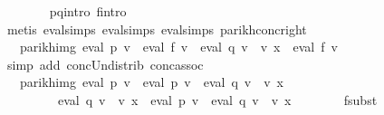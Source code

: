 \begin{isabellebody}
\ \ \ \ \ \ \isamarkupfalse%
\ p{}{\isacharunderscore}{\kern0pt}q{}{\isacharunderscore}{\kern0pt}intro\ f{}{\isacharprime}{\kern0pt}{\isacharunderscore}{\kern0pt}intro\isanewline
\ \ \ \ \ \ \isamarkupfalse%
\ {\isacharparenleft}{\kern0pt}metis\ eval{\isachardot}{\kern0pt}simps{\isacharparenleft}{\kern0pt}{}{\isacharparenright}{\kern0pt}\ eval{\isachardot}{\kern0pt}simps{\isacharparenleft}{\kern0pt}{}{\isacharparenright}{\kern0pt}\ eval{\isachardot}{\kern0pt}simps{\isacharparenleft}{\kern0pt}{}{\isacharparenright}{\kern0pt}\ parikh{\isacharunderscore}{\kern0pt}conc{\isacharunderscore}{\kern0pt}right{\isacharparenright}{\kern0pt}\isanewline
\ \ \ \ \isamarkupfalse%
\ \isamarkupfalse%
\ {\isachardoublequoteopen}{\isasymdots}\ {\isacharequal}{\kern0pt}\ parikh{\isacharunderscore}{\kern0pt}img\ {\isacharparenleft}{\kern0pt}eval\ p{}\ v\ {\isacharat}{\kern0pt}{\isacharat}{\kern0pt}\ eval\ f{}\ v\ {\isasymunion}\ eval\ q{}\ v\ {\isacharat}{\kern0pt}{\isacharat}{\kern0pt}\ v\ x\ {\isacharat}{\kern0pt}{\isacharat}{\kern0pt}\ eval\ f{}\ v{\isacharparenright}{\kern0pt}{\isachardoublequoteclose}\isanewline
\ \ \ \ \ \ \isamarkupfalse%
\ {\isacharparenleft}{\kern0pt}simp\ add{\isacharcolon}{\kern0pt}\ conc{\isacharunderscore}{\kern0pt}Un{\isacharunderscore}{\kern0pt}distrib{\isacharparenleft}{\kern0pt}{}{\isacharparenright}{\kern0pt}\ conc{\isacharunderscore}{\kern0pt}assoc{\isacharparenright}{\kern0pt}\isanewline
\ \ \ \ \isamarkupfalse%
\ \isamarkupfalse%
\ {\isachardoublequoteopen}{\isasymdots}\ {\isacharequal}{\kern0pt}\ parikh{\isacharunderscore}{\kern0pt}img\ {\isacharparenleft}{\kern0pt}eval\ p{}\ v\ {\isacharat}{\kern0pt}{\isacharat}{\kern0pt}\ {\isacharparenleft}{\kern0pt}eval\ p{}\ v\ {\isasymunion}\ eval\ q{}\ v\ {\isacharat}{\kern0pt}{\isacharat}{\kern0pt}\ v\ x{\isacharparenright}{\kern0pt}\isanewline
\ \ \ \ \ \ \ \ {\isasymunion}\ eval\ q{}\ v\ {\isacharat}{\kern0pt}{\isacharat}{\kern0pt}\ v\ x\ {\isacharat}{\kern0pt}{\isacharat}{\kern0pt}\ {\isacharparenleft}{\kern0pt}eval\ p{}\ v\ {\isasymunion}\ eval\ q{}\ v\ {\isacharat}{\kern0pt}{\isacharat}{\kern0pt}\ v\ x{\isacharparenright}{\kern0pt}{\isacharparenright}{\kern0pt}{\isachardoublequoteclose}\isanewline
\ \ \ \ \ \ \isamarkupfalse%
\ f{}{\isacharunderscore}{\kern0pt}subst\ \isamarkupfalse%

\end{isabellebody}
